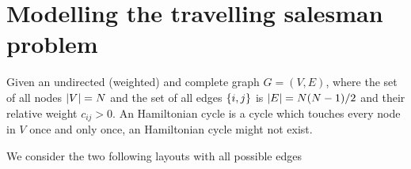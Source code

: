 \section{Modelling the travelling salesman problem}\label{sc:tsp}

Given an undirected (weighted) and complete graph $G=(V,E)$, where the set of all nodes $\lvert V\rvert=N$ and the set of all edges $\{i,j\}$ is $\lvert E\rvert=N(N-1)/2$ and their relative weight $c_{ij}>0$. An Hamiltonian cycle is a cycle which touches every node in $V$ once and only once, an Hamiltonian cycle might not exist.

We consider the two following layouts with all possible edges

